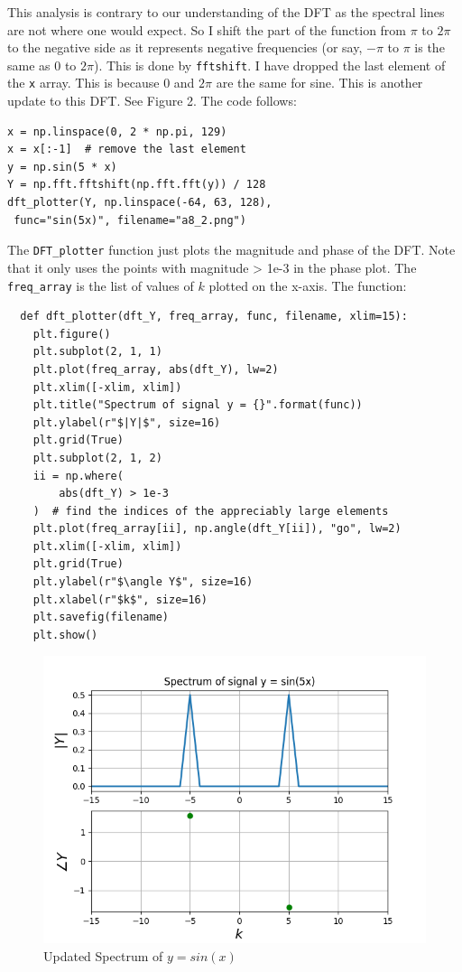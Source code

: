 \documentclass[11pt, a4paper]{article}
\begin{document}
This analysis is contrary to our understanding of the DFT as the spectral lines are not where one would expect. So I shift the part of the function from $\pi$ to $2\pi$ to the negative side as it represents negative frequencies (or say, $-\pi$ to $\pi$ is the same as $0$ to $2\pi$). This is done by \texttt{fftshift}. I have dropped the last element of the \texttt{x} array. This is because 0 and $2\pi$ are the same for sine. This is another update to this DFT. See Figure 2.
The code follows:
\begin{verbatim}
x = np.linspace(0, 2 * np.pi, 129)
x = x[:-1]  # remove the last element
y = np.sin(5 * x)
Y = np.fft.fftshift(np.fft.fft(y)) / 128
dft_plotter(Y, np.linspace(-64, 63, 128),
 func="sin(5x)", filename="a8_2.png")
\end{verbatim}
  
  The \texttt{DFT\_plotter} function just plots the magnitude and phase of the DFT. Note that it only uses the points with magnitude > 1e-3 in the phase plot. The \texttt{freq\_array} is the list of values of $k$ plotted on the x-axis.    
  The function:
  \begin{verbatim}
  def dft_plotter(dft_Y, freq_array, func, filename, xlim=15):
    plt.figure()
    plt.subplot(2, 1, 1)
    plt.plot(freq_array, abs(dft_Y), lw=2)
    plt.xlim([-xlim, xlim])
    plt.title("Spectrum of signal y = {}".format(func))
    plt.ylabel(r"$|Y|$", size=16)
    plt.grid(True)
    plt.subplot(2, 1, 2)
    ii = np.where(
        abs(dft_Y) > 1e-3
    )  # find the indices of the appreciably large elements
    plt.plot(freq_array[ii], np.angle(dft_Y[ii]), "go", lw=2)
    plt.xlim([-xlim, xlim])
    plt.grid(True)
    plt.ylabel(r"$\angle Y$", size=16)
    plt.xlabel(r"$k$", size=16)
    plt.savefig(filename)
    plt.show()
  \end{verbatim}
  \begin{figure}[!tbh]
   	\centering
  \includegraphics[scale=0.5]{a8_2.png} 
    \caption{Updated Spectrum of $y=sin(x)$} 	
   \end{figure} 
   
\end{document}
